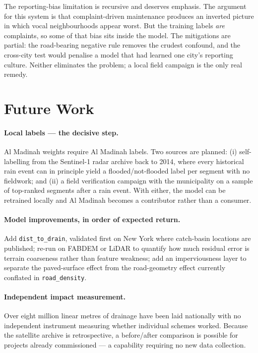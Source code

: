 \documentclass[11pt,a4paper]{article}
\newcommand{\ttt}[1]{\texttt{#1}}
\begin{document}
The reporting-bias limitation is recursive and deserves emphasis. The argument for this
system is that complaint-driven maintenance produces an inverted picture in which vocal
neighbourhoods appear worst. But the training labels \emph{are} complaints, so some of
that bias sits inside the model. The mitigations are partial: the road-bearing negative
rule removes the crudest confound, and the cross-city test would penalise a model that had
learned one city's reporting culture. Neither eliminates the problem; a local field
campaign is the only real remedy.

\section{Future Work}\label{sec:future}

\paragraph{Local labels --- the decisive step.}
Al Madinah weights require Al Madinah labels. Two sources are planned: (i) self-labelling
from the Sentinel-1 radar archive back to 2014, where every historical rain event can in
principle yield a flooded/not-flooded label per segment with no fieldwork; and (ii) a field
verification campaign with the municipality on a sample of top-ranked segments after a rain
event. With either, the model can be retrained locally and Al Madinah becomes a
contributor rather than a consumer.

\paragraph{Model improvements, in order of expected return.}
Add \ttt{dist\_to\_drain}, validated first on New York where catch-basin locations are
published; re-run on FABDEM or LiDAR to quantify how much residual error is terrain
coarseness rather than feature weakness; add an imperviousness layer to separate the
paved-surface effect from the road-geometry effect currently conflated in
\ttt{road\_density}.

\paragraph{Independent impact measurement.}
Over eight million linear metres of drainage have been laid nationally with no independent
instrument measuring whether individual schemes worked. Because the satellite archive is
retrospective, a before/after comparison is possible for projects already commissioned ---
a capability requiring no new data collection.
\end{document}
